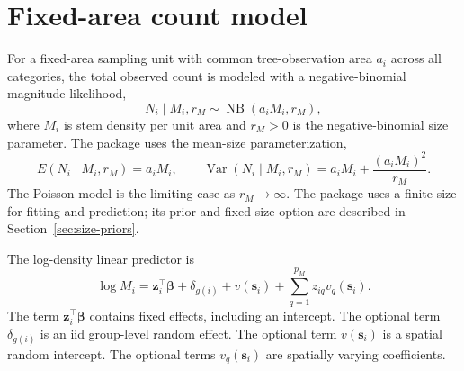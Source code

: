 \documentclass[11pt]{article}
\newcommand{\bbeta}{\bm{\beta}}
\newcommand{\bz}{\bm{z}}
\newcommand{\bs}{\bm{s}}
\newcommand{\trans}{^\top}
\newcommand{\NB}{\operatorname{NB}}
\begin{document}
\section{Fixed-area count model}

For a fixed-area sampling unit with common tree-observation area \(a_i\) across
all categories, the total observed count is modeled with a negative-binomial
magnitude likelihood,
\begin{equation}
  N_i \mid M_i,r_M \sim \NB(a_i M_i,r_M),
  \label{eq:fixed-area-total}
\end{equation}
where \(M_i\) is stem density per unit area and \(r_M>0\) is the
negative-binomial size parameter. The package uses the mean-size
parameterization,
\begin{equation}
  E(N_i\mid M_i,r_M)=a_iM_i,
  \qquad
  \operatorname{Var}(N_i\mid M_i,r_M)
    =
    a_iM_i + \frac{(a_iM_i)^2}{r_M}.
  \label{eq:nb-mean-size}
\end{equation}
The Poisson model is the limiting case as \(r_M\rightarrow\infty\).
The package uses a finite size for fitting and prediction; its prior and
fixed-size option are described in Section~\ref{sec:size-priors}.

The log-density linear predictor is
\begin{equation}
  \log M_i
    =
    \bz_i\trans\bbeta
    + \delta_{g(i)}
    + v(\bs_i)
    + \sum_{q=1}^{p_M} z_{iq} v_{q}(\bs_i).
  \label{eq:magnitude-linear}
\end{equation}
The term \(\bz_i\trans\bbeta\) contains fixed effects, including an
intercept. The optional term \(\delta_{g(i)}\) is an iid group-level random
effect. The optional term \(v(\bs_i)\) is a spatial random intercept. The
optional terms \(v_{q}(\bs_i)\) are spatially varying coefficients.
\end{document}
